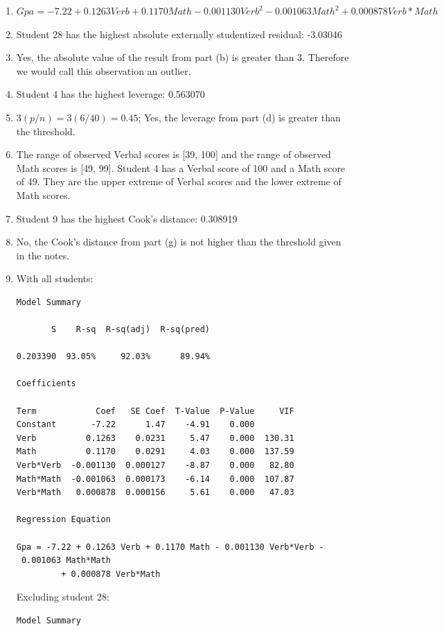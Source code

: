 \documentclass{article}
\begin{document}
\begin{enumerate}
\def\labelenumi{\alph{enumi})}
\item
  \(Gpa = -7.22 + 0.1263 Verb + 0.1170 Math - 0.001130 Verb^2 - 0.001063 Math^2 + 0.000878 Verb*Math\)
\item
  Student 28 has the highest absolute externally studentized residual:
  -3.03046
\item
  Yes, the absolute value of the result from part (b) is greater than 3.
  Therefore we would call this observation an outlier.
\item
  Student 4 has the highest leverage: 0.563070
\item
  \(3(p/n) = 3(6/40) = 0.45\); Yes, the leverage from part (d) is
  greater than the threshold.
\item
  The range of observed Verbal scores is {[}39, 100{]} and the range of
  observed Math scores is {[}49, 99{]}. Student 4 has a Verbal score of
  100 and a Math score of 49. They are the upper extreme of Verbal
  scores and the lower extreme of Math scores.
\item
  Student 9 has the highest Cook's distance: 0.308919
\item
  No, the Cook's distance from part (g) is not higher than the threshold
  given in the notes.
  
\newpage
\item
  With all students:

\begin{verbatim}
Model Summary

       S    R-sq  R-sq(adj)  R-sq(pred)

0.203390  93.05%     92.03%      89.94%

Coefficients

Term            Coef   SE Coef  T-Value  P-Value     VIF
Constant       -7.22      1.47    -4.91    0.000
Verb          0.1263    0.0231     5.47    0.000  130.31 
Math          0.1170    0.0291     4.03    0.000  137.59 
Verb*Verb  -0.001130  0.000127    -8.87    0.000   82.80 
Math*Math  -0.001063  0.000173    -6.14    0.000  107.87 
Verb*Math   0.000878  0.000156     5.61    0.000   47.03

Regression Equation

Gpa = -7.22 + 0.1263 Verb + 0.1170 Math - 0.001130 Verb*Verb - 0.001063 Math*Math 
         + 0.000878 Verb*Math
  \end{verbatim}
  
Excluding student 28:

\begin{verbatim}
Model Summary


\end{verbatim}
\end{enumerate}
\end{document}
